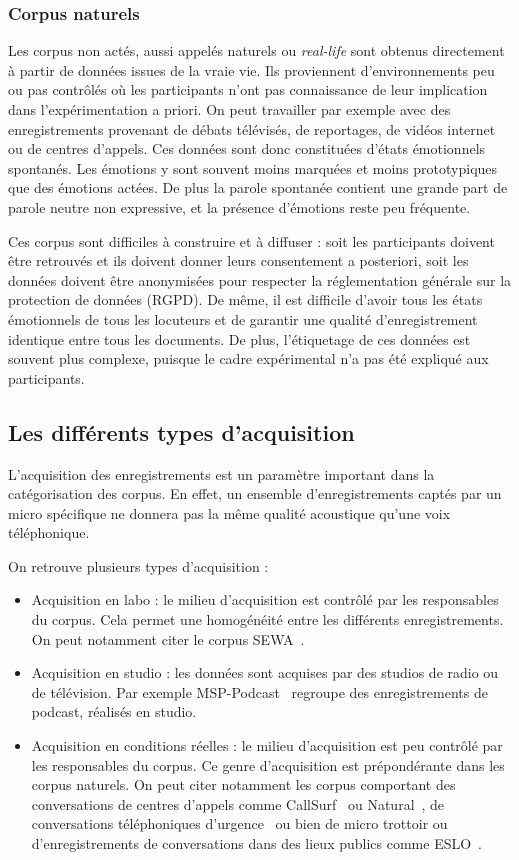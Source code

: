 \subsubsection{Corpus naturels}
Les corpus non actés, aussi appelés naturels ou \textit{real-life} sont obtenus directement à partir de données issues de la vraie vie. Ils proviennent d'environnements peu ou pas contrôlés où les participants n'ont pas connaissance de leur implication dans l'expérimentation a priori. On peut travailler par exemple avec des enregistrements provenant de débats télévisés, de reportages, de vidéos internet ou de centres d'appels. Ces données sont donc constituées d'états émotionnels spontanés. Les émotions y sont souvent moins marquées et moins prototypiques que des émotions actées. De plus la parole spontanée contient une grande part de parole neutre non expressive, et la présence d'émotions reste peu fréquente.

Ces corpus sont difficiles à construire et à diffuser : soit les participants doivent être retrouvés et ils doivent donner leurs consentement a posteriori, soit les données doivent être anonymisées pour respecter la réglementation générale sur la protection de données (RGPD). De même, il est difficile d'avoir tous les états émotionnels de tous les locuteurs et de garantir une qualité d'enregistrement identique entre tous les documents.
De plus, l'étiquetage de ces données est souvent plus complexe, puisque le cadre expérimental n'a pas été expliqué aux participants.

\subsection{Les différents types d'acquisition}
L'acquisition des enregistrements est un paramètre important dans la catégorisation des corpus. En effet, un ensemble d'enregistrements captés par un micro spécifique ne donnera pas la même qualité acoustique qu'une voix téléphonique.

On retrouve plusieurs types d'acquisition :
\begin{itemize}
  \item Acquisition en labo : le milieu d'acquisition est contrôlé par les responsables du corpus. Cela permet une homogénéité entre les différents enregistrements. On peut notamment citer le corpus SEWA~\cite{SEWA}.
  \item Acquisition en studio : les données sont acquises par des studios de radio ou de télévision. Par exemple MSP-Podcast~\cite{Lotfian2019} regroupe des enregistrements de podcast, réalisés en studio.
  \item Acquisition en conditions réelles : le milieu d'acquisition est peu contrôlé par les responsables du corpus. Ce genre d'acquisition est prépondérante dans les corpus naturels. On peut citer notamment les corpus comportant des conversations de centres d'appels comme CallSurf~\cite{Garnier2008} ou Natural~\cite{Morrison2007}, de conversations téléphoniques d'urgence~\cite{Devillers2010} ou bien de micro trottoir ou d'enregistrements de conversations dans des lieux publics comme ESLO~\cite{Eshkol2011}.
\end{itemize}

